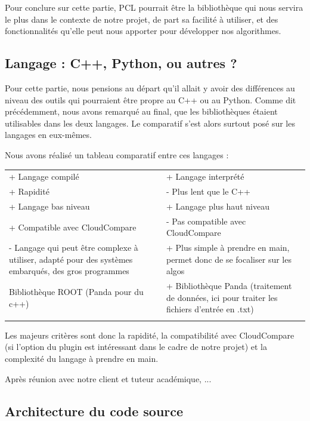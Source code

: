 \documentclass[12pt,titlepage,french]{article}
\begin{document}
Pour conclure sur cette partie, PCL pourrait être la bibliothèque qui nous servira le plus dans le contexte de notre projet, de part sa facilité à utiliser, et des fonctionnalités qu'elle peut nous apporter pour développer nos algorithmes.

\subsection{Langage : C++, Python, ou autres ?}

Pour cette partie, nous pensions au départ qu'il allait y avoir des différences au niveau des outils qui pourraient être propre au C++ ou au Python. Comme dit précédemment, nous avons remarqué au final, que les bibliothèques étaient utilisables dans les deux langages. Le comparatif s'est alors surtout posé sur les langages en eux-mêmes.

Nous avons réalisé un tableau comparatif entre ces langages : \\

\noindent\begin{tabu} to \textwidth {X[c]X[c]}\toprule
  &\\\toprule
+ Langage compilé
& + Langage interprété\\\midrule
+ Rapidité
& - Plus lent que le C++\\\midrule
+ Langage bas niveau
& + Langage plus haut niveau\\\midrule
+ Compatible avec CloudCompare
& - Pas compatible avec CloudCompare\\\midrule
- Langage qui peut être complexe à utiliser, adapté pour des systèmes embarqués, des gros programmes
& + Plus simple à prendre en main, permet donc de se focaliser sur les algos\\\midrule
 Bibliothèque ROOT (Panda pour du c++)
& + Bibliothèque Panda (traitement de données, ici pour traiter les fichiers d'entrée en .txt)\\\bottomrule  \\
\end{tabu}

Les majeurs critères sont donc la rapidité, la compatibilité avec CloudCompare (si l'option du plugin est intéressant dans le cadre de notre projet) et la complexité du langage à prendre en main.

Après réunion avec notre client et tuteur académique,
...

\subsection{Architecture du code source}
\end{document}
